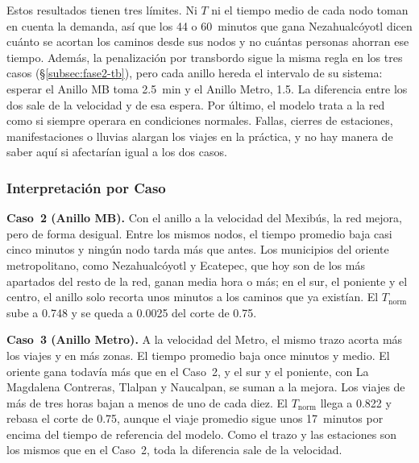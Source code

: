 Estos resultados tienen tres límites. Ni $T$ ni el tiempo medio de cada nodo
toman en cuenta la demanda, así que los 44 o 60~minutos que gana
Nezahualcóyotl dicen cuánto se acortan los caminos desde sus nodos y no cuántas
personas ahorran ese tiempo. Además, la penalización por transbordo sigue
la misma regla en los tres casos (§\ref{subsec:fase2-tb}), pero cada anillo
hereda el intervalo de su sistema: esperar el Anillo MB toma 2.5~min y el Anillo
Metro, 1.5. La diferencia entre los dos sale de la velocidad y de esa espera.
Por último, el modelo trata a la red como si siempre operara en condiciones
normales. Fallas, cierres de estaciones, manifestaciones o lluvias
alargan los viajes en la práctica, y no hay manera de saber aquí si afectarían
igual a los dos casos.

\subsubsection{Interpretación por Caso}

\textbf{Caso~2 (Anillo MB).} Con el anillo a la velocidad del Mexibús, la red
mejora, pero de forma desigual. Entre los mismos nodos, el tiempo promedio baja
casi cinco minutos y ningún nodo tarda más que antes. Los municipios del
oriente metropolitano, como Nezahualcóyotl y Ecatepec, que hoy son de los más
apartados del resto de la red, ganan media hora o más; en el sur, el poniente
y el centro, el anillo solo recorta unos minutos a los caminos que ya existían.
El $T_{\text{norm}}$ sube a 0.748 y se queda a 0.0025 del corte de 0.75.

\textbf{Caso~3 (Anillo Metro).} A la velocidad del Metro, el mismo trazo acorta
más los viajes y en más zonas. El tiempo promedio baja once minutos y medio. El
oriente gana todavía más que en el Caso~2, y el sur y el poniente, con La
Magdalena Contreras, Tlalpan y Naucalpan, se suman a la mejora. Los viajes de
más de tres horas bajan a menos de uno de cada diez. El $T_{\text{norm}}$
llega a 0.822 y rebasa el corte de 0.75, aunque el viaje promedio sigue unos
17~minutos por encima del tiempo de referencia del modelo. Como el trazo y las
estaciones son los mismos que en el Caso~2, toda la diferencia sale de la
velocidad.
